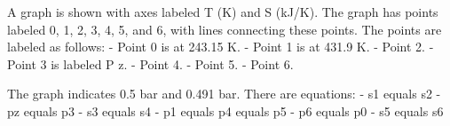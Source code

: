 A graph is shown with axes labeled T (K) and S (kJ/K). The graph has points labeled 0, 1, 2, 3, 4, 5, and 6, with lines connecting these points. The points are labeled as follows:
- Point 0 is at 243.15 K.
- Point 1 is at 431.9 K.
- Point 2.
- Point 3 is labeled P z.
- Point 4.
- Point 5.
- Point 6.

The graph indicates 0.5 bar and 0.491 bar. There are equations:
- s1 equals s2
- pz equals p3
- s3 equals s4
- p1 equals p4 equals p5
- p6 equals p0
- s5 equals s6